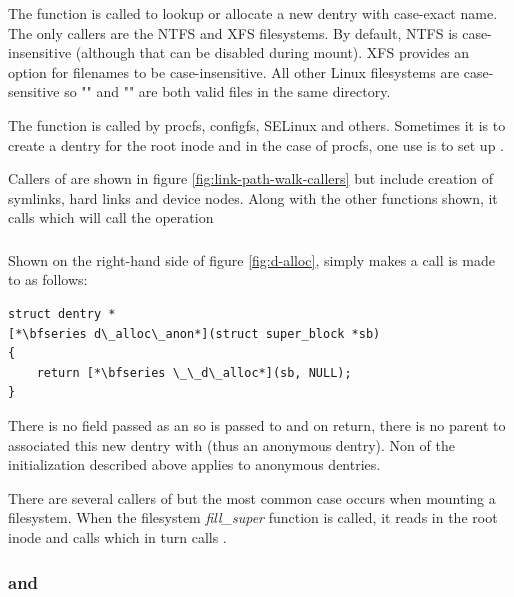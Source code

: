 \noindent
The function  is called to lookup or allocate a new dentry with case-exact name. The only callers are the NTFS and XFS filesystems. By default, NTFS is case-insensitive (although that can be disabled during mount). XFS provides an option for filenames to be case-insensitive. All other Linux filesystems are case-sensitive so "" and "" are both valid files in the same directory.

The  function is called by procfs, configfs, SELinux and others. Sometimes it is to create a dentry for the root inode and in the case of procfs, one use is to set up .

Callers of  are shown in figure \ref{fig:link-path-walk-callers} but include creation of symlinks, hard links and device nodes. Along with the other functions shown, it calls  which will call the  operation 

\subsubsection{}

Shown on the right-hand side of figure \ref{fig:d-alloc},  simply makes a call is made to  as follows:

\begin{lstlisting}
struct dentry *
[*\bfseries d\_alloc\_anon*](struct super_block *sb)
{
    return [*\bfseries \_\_d\_alloc*](sb, NULL);
}
\end{lstlisting}

\noindent
There is no  field passed as an so  is passed to  and on return, there is no parent to associated this new dentry with (thus an anonymous dentry). Non of the initialization described above applies to anonymous dentries.

There are several callers of  but the most common case occurs when mounting a filesystem. When the filesystem \textit{fill\_super} function is called, it reads in the root inode and calls  which in turn calls .


\subsubsection{ and }

